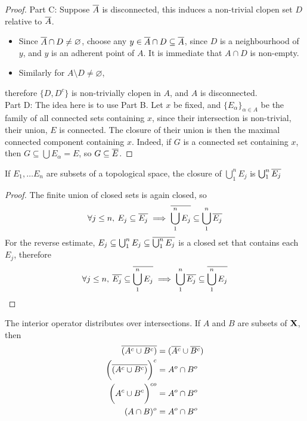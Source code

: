 \documentclass[../../main.tex]{subfiles}
\begin{document}
\begin{proof}
    Part C: Suppose $\overline{A}$ is disconnected, this induces a non-trivial clopen set $D$ relative to $\overline{A}$. 
    \begin{itemize}
        \item Since $\overline{A}\cap D\neq\varnothing$, choose any $y\in\overline{A}\cap D\subseteq \overline{A}$, since $D$ is a neighbourhood of $y$, and $y$ is an adherent point of $A$. It is immediate that $A\cap D$ is non-empty.
        \item Similarly for $A\setminus D\neq\varnothing$,
    \end{itemize}
    therefore $\{D,D^c\}$ is non-trivially clopen in $A$, and $A$ is disconnected.\\

    Part D: The idea here is to use Part B. Let $x$ be fixed, and $\{E_\alpha\}_{\alpha\in A}$ be the family of all connected sets containing $x$, since their intersection is non-trivial, their union, $E$ is connected. The closure of their union is then the maximal connected component containing $x$. Indeed, if $G$ is a connected set containing $x$, then $G\subseteq \bigcup E_\alpha = E$, so $G\subseteq \overline{E}$.
\end{proof}
\newpage

\begin{wts}
    If $E_1,\ldots E_n$ are subsets of a topological space, the closure of $\bigcup_1^n E_j$ is $\bigcup_1^n \overline{E_j}$
\end{wts}
\begin{proof}
    The finite union of closed sets is again closed, so 
    \[
        \forall j\leq n,\: E_j\subseteq \overline{E_j}\implies \overline{\bigcup_1^n E_j}\subseteq \bigcup_1^n \overline{E_j}
    \]
    For the reverse estimate, $E_j\subseteq\bigcup_1^n E_j\subseteq \overline{\bigcup_1^n E_j}$ is a closed set that contains each $E_j$, therefore
    \[
        \forall j\leq n,\: \overline{E_j}\subseteq \overline{\bigcup_1^n E_j}\implies \bigcup_1^n \overline{E_j}\subseteq \overline{\bigcup_1^n E_j}
    \]
\end{proof}
\begin{corollary}
    The interior operator distributes over intersections. If $A$ and $B$ are subsets of ${\mathbf{X}}$, then
    \begin{align*}
        \overline{(A^c\cup  B^c)} &= (\overline{A^c}\cup \overline{B^c})\\
        \biggl(\overline{(A^c\cup  B^c)}\biggr)^c&= A^o\cap B^o\\
        \biggl(A^c\cup B^c\biggr)^{co} &= A^o\cap B^o\\
        (A\cap B)^o&=A^o\cap B^o
    \end{align*}
\end{corollary}
\newpage
\end{document}
